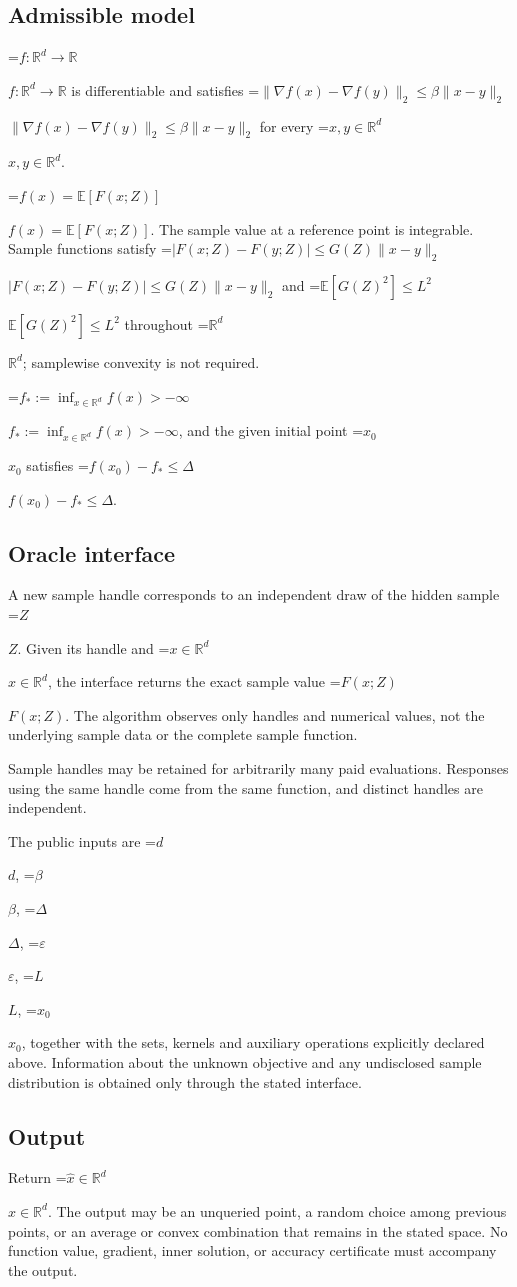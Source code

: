 \documentclass[10pt,a4paper]{article}
\newcommand{\AtlasMath}[1]{\par\begingroup\centering\setbox0=\hbox{$\displaystyle #1$}\ifdim\wd0>1.4\linewidth\typeout{ATLAS WIDE FORMULA: \the\wd0}\fi\ifdim\wd0>\linewidth\resizebox{\linewidth}{!}{\box0}\else\box0\fi\par\endgroup}
\newcommand{\AtlasInlineMath}[1]{\begingroup\setbox0=\hbox{$#1$}\ifdim\wd0>.4\linewidth\endgroup\AtlasMath{#1}\else\endgroup$#1$\fi}
\begin{document}
\subsection{Admissible model}
\AtlasInlineMath{f:\mathbb{R}^d\to\mathbb{R}} is differentiable and satisfies \AtlasInlineMath{\|\nabla f(x)-\nabla f(y)\|_2\le\beta\|x-y\|_2} for every \AtlasInlineMath{x,y\in\mathbb{R}^d}.

\AtlasInlineMath{f(x)=\mathbb{E}[F(x;Z)]}. The sample value at a reference point is integrable. Sample functions satisfy \AtlasInlineMath{|F(x;Z)-F(y;Z)|\le G(Z)\|x-y\|_2} and \AtlasInlineMath{\mathbb{E}[G(Z)^2]\le L^2} throughout \AtlasInlineMath{\mathbb{R}^d}; samplewise convexity is not required.

\AtlasInlineMath{f_*:=\inf_{x\in\mathbb{R}^d}f(x)>-\infty}, and the given initial point \AtlasInlineMath{x_0} satisfies \AtlasInlineMath{f(x_0)-f_*\le\Delta}.

\subsection{Oracle interface}
A new sample handle corresponds to an independent draw of the hidden sample \AtlasInlineMath{Z}. Given its handle and \AtlasInlineMath{x\in \mathbb{R}^d}, the interface returns the exact sample value \AtlasInlineMath{F(x;Z)}. The algorithm observes only handles and numerical values, not the underlying sample data or the complete sample function.

Sample handles may be retained for arbitrarily many paid evaluations. Responses using the same handle come from the same function, and distinct handles are independent.

The public inputs are \AtlasInlineMath{d}, \AtlasInlineMath{\beta}, \AtlasInlineMath{\Delta}, \AtlasInlineMath{\varepsilon}, \AtlasInlineMath{L}, \AtlasInlineMath{x_0}, together with the sets, kernels and auxiliary operations explicitly declared above. Information about the unknown objective and any undisclosed sample distribution is obtained only through the stated interface.

\subsection{Output}
Return \AtlasInlineMath{\widehat{x}\in \mathbb{R}^d}. The output may be an unqueried point, a random choice among previous points, or an average or convex combination that remains in the stated space. No function value, gradient, inner solution, or accuracy certificate must accompany the output.
\end{document}
